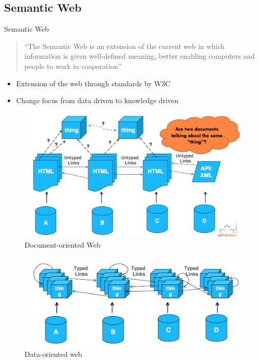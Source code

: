 \subsection{Semantic Web}


\begin{frame}
	\begin{block}{Semantic Web}
		\begin{quote}
			``The Semantic Web is an extension of the current web in which information is given well-defined meaning, better enabling computers and people to work in cooperation''~\cite{BernersLee01}
		\end{quote}
		\begin{itemize}
			\item Extension of the web through standards by W3C
			\item Change focus from data driven to knowledge driven
		\end{itemize}
	\end{block}
\end{frame}

\begin{frame}
	\begin{figure}
		\centering
		\includegraphics[width=\textwidth]{images/documentweb}
		\caption{Document-oriented Web}
		\label{fig:documentweb}
	\end{figure}
\end{frame}

\begin{frame}
	\begin{figure}
		\centering
		\includegraphics[width=\textwidth]{images/dataweb}
		\caption{Data-oriented web}
		\label{fig:dataweb}
	\end{figure}
\end{frame}


